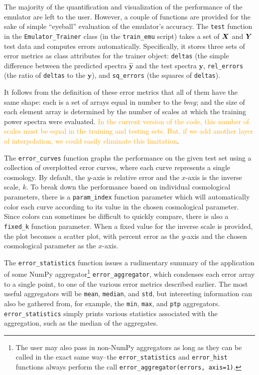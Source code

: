 The majority of the quantification and visualization of the performance of the
emulator are left to the user. However, a couple of functions are provided for 
the sake of simple ``eyeball'' evaluation of the emulator's accuracy.
The \verb|test| function in the \verb|Emulator_Trainer| class (in the
\verb|train_emu| script) takes a set of $\bm{X}$ and $\bm{Y}$ test data 
and computes errors automatically. Specifically, it stores three sets of error 
metrics as class attributes for the trainer object: \verb|deltas| (the simple 
difference between the predicted spectra $\hat{\bm{y}}$ and the test spectra
$\bm{y}$, \verb|rel_errors| (the ratio of \verb|deltas| to the $\bm{y}$), and
\verb|sq_errors| (the squares of \verb|deltas|).

It follows from the definition of these error metrics that all of them have 
the same shape: each is a set of arrays equal in number to the $bm{y}$; and 
the size of each element array is determined by the number of scales at which 
the training power spectra were evaluated. \textcolor{orange}{In the current
version of the code, this number of scales must be equal in the training and
testing sets. But, if we add another layer of interpolation, we could easily
eliminate this limitation}.

The \verb|error_curves| function graphs the performance on the given test set 
using a collection of overplotted error curves, where each curve represents a 
single cosmology. By default, the $y$-axis is relative error and the
$x$-axis is the inverse scale, $k$. To break down the performance based on 
individual cosmological parameters, there is a \verb|param_index| function
parameter which will automatically color each curve according to its value in 
the chosen cosmological parameter. Since colors can sometimes be difficult to 
quickly compare, there is also a \verb|fixed_k| function parameter. When a 
fixed value for the inverse scale is provided, the plot becomes a scatter 
plot, with percent error as the $y$-axis and the chosen cosmological parameter 
as the $x$-axis.


The \verb|error_statistics| function issues a rudimentary summary of the 
application of some NumPy aggregator\footnote{The user may also pass in
non-NumPy aggregators as long as they can be called in the exact same
way--the \verb|error_statistics| and \verb|error_hist| functions always
perform the call \verb|error_aggregator(errors, axis=1)|.}
\verb|error_aggregator|, which condenses each error array to a single point,
to one of the various error metrics described earlier. The 
most useful aggregators will be \verb|mean|, \verb|median|, and \verb|std|, 
but interesting information can also be gathered from, for example, the
\verb|min|, \verb|max|, and \verb|ptp| aggregators.
\verb|error_statistics| simply prints various statistics associated with the 
aggregation, such as the median of the aggregates.

